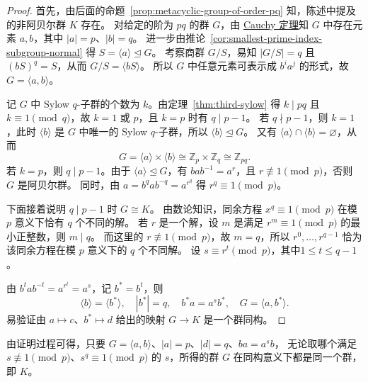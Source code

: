 \begin{proof}
首先，由后面的命题~\ref{prop:metacyclic-group-of-order-pq} 知，陈述中提及的非阿贝尔群 $K$ 存在。
对给定的阶为 $pq$ 的群 $G$，由 \hyperref[thm:cauchy-prime-order-element]{Cauchy 定理}知 $G$ 中存在元素 $a,b$，其中 $|a|=p$、$|b|=q$。
进一步由推论~\ref{cor:smallest-prime-index-subgroup-normal} 得 $S=\langle a\rangle\trianglelefteq G$。
考察商群 $G/S$，易知 $|G/S|=q$ 且 $(bS)^q=S$，从而 $G/S=\langle bS\rangle$。
所以 $G$ 中任意元素可表示成 $b^ia^j$ 的形式，故 $G=\langle a,b\rangle$。

记 $G$ 中 Sylow $q$-子群的个数为 $k$。由定理~\ref{thm:third-sylow} 得 $k\mid pq$ 且 $k\equiv1\pmod q$，故 $k=1$ 或 $p$，且 $k=p$ 时有 $q\mid p-1$。
若 $q\nmid p-1$，则 $k=1$，此时 $\langle b\rangle$ 是 $G$ 中唯一的 Sylow $q$-子群，所以 $\langle b\rangle\trianglelefteq G$。
又有 $\langle a\rangle\cap\langle b\rangle=\varnothing$，从而
\[
  G=\langle a\rangle\times\langle b\rangle
    \cong\mathbb Z_p\times\mathbb Z_q\cong\mathbb Z_{pq}.
\]
若 $k=p$，则 $q\mid p-1$。由于 $\langle a\rangle\trianglelefteq G$，有 $bab^{-1}=a^r$，且 $r\not\equiv1\pmod p$，否则 $G$ 是阿贝尔群。
同时，由 $a=b^qab^{-q}=a^{r^q}$ 得 $r^q\equiv1\pmod p$。

下面接着说明 $q\mid p-1$ 时 $G\cong K$。
由数论知识，同余方程 $x^q\equiv1\pmod p$ 在模 $p$ 意义下恰有 $q$ 个不同的解。
若 $r$ 是一个解，设 $m$ 是满足 $r^m\equiv1\pmod p$ 的最小正整数，则 $m\mid q$。
而这里的 \mbox{$r\not\equiv1\pmod p$}，故 $m=q$，所以 $r^0,\ldots,r^{q-1}$ 恰为该同余方程在模 $p$ 意义下的 $q$ 个不同解。
设 \mbox{$s\equiv r^t\pmod p$}，其中$1 \leq t \leq q-1$。

由 $b^tab^{-t}=a^{r^t}=a^s$，记 $b^*=b^t$，则
\[
  \langle b\rangle=\langle b^*\rangle,\quad |b^*|=q,\quad
  b^*a=a^sb^*,\quad G=\langle a,b^*\rangle.
\]
易验证由 $a\mapsto c$、$b^*\mapsto d$ 给出的映射 $G\to K$ 是一个群同构。
\end{proof}

\begin{purplenote}
由证明过程可得，只要 $G=\langle a,b\rangle$、$|a|=p$、$|d|=q$、$ba=a^sb$，
无论取哪个满足 $s\not\equiv1\pmod p$、$s^q\equiv1\pmod p$ 的 $s$，所得的群 $G$ 在同构意义下都是同一个群，即 $K$。
\end{purplenote}

